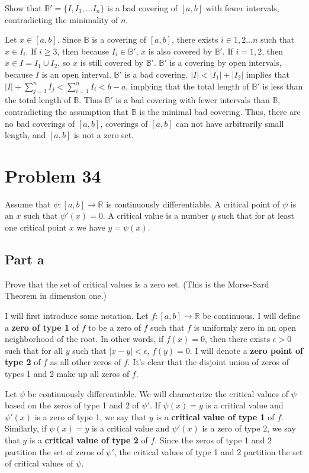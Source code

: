 \documentclass{article}
\newcommand{\R}{\mathbb{R}}
\newcommand{\B}{\mathbb{B}}
\begin{document}
Show that $\B' = \{I, I_3, \dots I_n\}$ is a bad covering of $[a, b]$ with fewer intervals, contradicting the minimality of $n$.

Let $x \in [a, b]$. Since $\B$ is a covering of $[a, b]$, there exists $i \in 1, 2 \dots n$ such that $x \in I_i$. If $i \geq 3$, then because $I_i \in \B'$, $x$ is also covered by $\B'$. If $i = 1, 2$, then $x \in I = I_1 \cup I_2$, so $x$ is still covered by $\B'$. $\B'$ is a covering by open intervals, because $I$ is an open interval. $\B'$ is a bad covering. $|I| < |I_1| + |I_2|$ implies that $|I| + \sum_{j=3}^n I_j < \sum_{i=1}^n I_i < b-a$, implying that the total length of $\B'$ is less than the total length of $\B$. Thus $\B'$ is a bad covering with fewer intervals than $\B$, contradicting the assumption that $\B$ is the minimal bad covering. Thus, there are no bad coverings of $[a, b]$, coverings of $[a, b]$ can not have arbitrarily small length, and $[a, b]$ is not a zero set.

\section*{Problem 34}

Assume that $\psi: [a, b] \rightarrow \R$ is continuously differentiable. A critical point of $\psi$ is an $x$ such that $\psi'(x) = 0$. A critical value is a number $y$ such that for at least one critical point $x$ we have $y = \psi(x)$.

\subsection*{Part a}

Prove that the set of critical values is a zero set. (This is the Morse-Sard Theorem in dimension one.)

I will first introduce some notation. Let $f: [a, b] \rightarrow \R$ be continuous. I will define a \textbf{zero of type 1} of $f$ to be a zero of $f$ such that $f$ is uniformly zero in an open neighborhood of the root. In other words, if $f(x) = 0$, then there exists $\epsilon > 0$ such that for all $y$ such that $|x-y| < \epsilon$, $f(y) = 0$. I will denote a \textbf{zero point of type 2} of $f$ as all other zeros of $f$. It's clear that the disjoint union of zeros of types 1 and 2 make up all zeros of $f$.

Let $\psi$ be continuously differentiable. We will characterize the critical values of $\psi$ based on the zeros of type 1 and 2 of $\psi'$. If $\psi(x) = y$ is a critical value and $\psi'(x)$ is a zero of type 1, we say that $y$ is a \textbf{critical value of type 1} of $f$. Similarly, if $\psi(x) = y$ is a critical value and $\psi'(x)$ is a zero of type 2, we say that $y$ is a \textbf{critical value of type 2} of $f$. Since the zeros of type 1 and 2 partition the set of zeros of $\psi'$, the critical values of type 1 and 2 partition the set of critical values of $\psi$.
\end{document}
